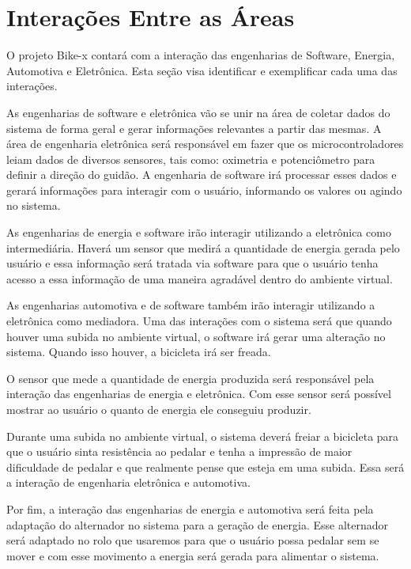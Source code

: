 \chapter[Interações]{Interações Entre as Áreas}

O projeto Bike-x contará com a interação das engenharias de Software, Energia, Automotiva e Eletrônica. Esta seção visa identificar e exemplificar cada uma 
das interações. 

As engenharias de software e eletrônica vão se unir na área de coletar dados do sistema de forma geral e gerar informações relevantes a partir das mesmas. 
A área de engenharia eletrônica será responsável em fazer que os microcontroladores leiam dados de diversos sensores, tais como: oximetria e potenciômetro para 
definir a direção do guidão.  A engenharia de software irá processar esses dados e gerará informações para interagir com o usuário, informando os valores ou 
agindo no sistema.

As engenharias de energia e software irão interagir utilizando a eletrônica como intermediária. Haverá um sensor que medirá a quantidade de energia gerada 
pelo usuário e essa informação será tratada via software para que o usuário tenha acesso a essa informação de uma maneira agradável dentro do ambiente virtual.

As engenharias automotiva e de software também irão interagir utilizando a eletrônica como mediadora. Uma das interações com o sistema será que quando houver 
uma subida no ambiente virtual, o software irá gerar uma alteração no sistema. Quando isso houver, a bicicleta irá ser freada.

O sensor que mede a quantidade de energia produzida será responsável pela interação das engenharias de energia e eletrônica. Com esse sensor será possível 
mostrar ao usuário o quanto de energia ele conseguiu produzir. 

Durante uma subida no ambiente virtual, o sistema deverá freiar a bicicleta para que o usuário sinta resistência ao pedalar e tenha a impressão de maior 
dificuldade de pedalar e que realmente pense que esteja em uma subida. Essa será a interação de engenharia eletrônica e automotiva.

Por fim, a interação das engenharias de energia e automotiva será feita pela adaptação do alternador no sistema para a geração de energia. Esse alternador 
será adaptado no rolo que usaremos para que o usuário possa pedalar sem se mover e com esse movimento a energia será gerada para alimentar o sistema.

